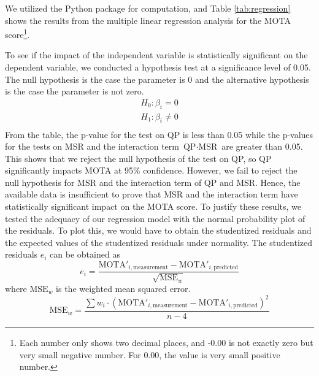 We utilized the Python package \cite{seabold_statsmodels_2010} for computation, and Table \ref{tab:regression} shows the results from the multiple linear regression analysis for the MOTA score\footnote{Each number only shows two decimal places, and -0.00 is not exactly zero but very small negative number. For 0.00, the value is very small positive number.}.

To see if the impact of the independent variable is statistically significant on the dependent variable, we conducted a hypothesis test at a significance level of 0.05. The null hypothesis is the case the parameter is 0 and the alternative hypothesis is the case the parameter is not zero.
\begin{equation}
    \begin{aligned}
        H_0: \beta_i = 0 \\
        H_1: \beta_i \neq 0 \\
    \end{aligned}
\end{equation}
From the table, the p-value for the test on QP is less than 0.05 while the p-values for the tests on MSR and the interaction term $\text{QP} \cdot \text{MSR}$ are greater than 0.05. This shows that we reject the null hypothesis of the test on QP, so QP significantly impacts MOTA at 95\% confidence. However, we fail to reject the null hypothesis for MSR and the interaction term of QP and MSR. Hence, the available data is insufficient to prove that MSR and the interaction term have statistically significant impact on the MOTA score. To justify these results, we tested the adequacy of our regression model with the normal probability plot of the residuals. To plot this, we would have to obtain the studentized residuals and the expected values of the studentized residuals under normality. The studentized residuals $e_i$ can be obtained as
\begin{equation}
    e_i = \frac{ \text{MOTA}'_{i,\text{measurement}} - \text{MOTA}'_{i,\text{predicted}} }{\sqrt{\text{MSE}_w}}
    \label{eqn:residuals}
\end{equation}
where $\text{MSE}_w$ is the weighted mean squared error.
\begin{equation}
    \text{MSE}_w = \frac{\sum w_i \cdot ( \text{MOTA}'_{i,\text{measurement}} - \text{MOTA}'_{i,\text{predicted}} )^2 }{n-4}
\end{equation}
